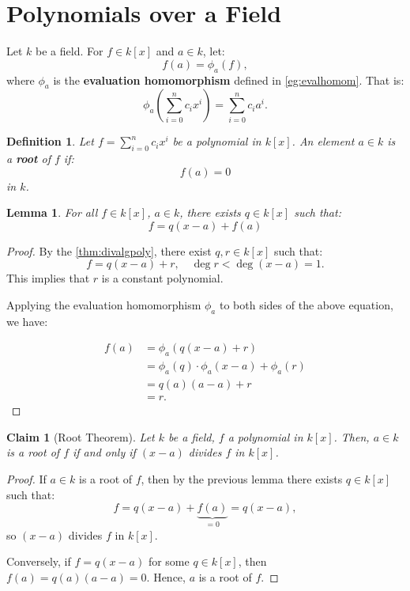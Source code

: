 \documentclass[a4paper,12pt]{report}
\newcommand{\class}[2]{#2}
\newcounter{statement}
\numberwithin{statement}{chapter}
\newtheorem{defn}[statement]{Definition}
\newtheorem{lemma}[statement]{Lemma}
\newtheorem{claim}[statement]{Claim}
\numberwithin{equation}{chapter}
\numberwithin{section}{chapter}
\numberwithin{subsection}{section}
\begin{document}
\section{Polynomials over a Field}

Let $k$ be a field.
For $f \in k[x]$ and $a \in k$, let:
\[
f(a) = \phi_a(f),
\]
where $\phi_a$ is the  {\bf evaluation homomorphism}  defined in \cref{eg:evalhomom}.
That is:
\[
\phi_a\left(\sum_{i = 0}^nc_ix^i \right) = \sum_{i = 0}^nc_ia^i .
\]



\begin{defn}
Let $f = \sum_{i = 0}^nc_ix^i$ be a polynomial in $k[x]$.
An element $a \in k$ is a  {\bf root}  of $f$ if:
\[
f(a) = 0
\]
in $k$.
\end{defn}







\begin{lemma}
For all $f \in k[x]$, $a \in k$, there exists $q \in k[x]$ such that:
\[
f = q(x - a) + f(a)
\]
\end{lemma}
\begin{proof}
By the \cref{thm:divalgpoly},
there exist $q, r \in k[x]$ such that:
\[
f = q(x - a) + r,\quad \deg r < \deg (x - a) = 1.
\]
This implies that $r$ is a constant polynomial.




Applying the evaluation homomorphism $\phi_a$ to both sides of the above equation,
we have:

\[
\begin{split}
f(a) &= \phi_a(q(x - a) + r)
\\&
\class{steps11 steps}{= \phi_a(q)\cdot\phi_a(x - a) + \phi_a(r)}
\\&
\class{steps11 steps}{ = q(a)(a - a) + r}
\\&
\class{steps11 steps}{= r.}
\end{split}
\]

\end{proof}




\begin{claim}[Root Theorem]


Let $k$ be a field, $f$ a polynomial in $k[x]$.  Then, $a \in k$
is a root of $f$ if and only if $(x - a)$ divides $f$ in $k[x]$.
\end{claim}
\begin{proof}
If $a \in k$ is a root of $f$, then by the previous lemma there exists $q \in k[x]$
such that:
\[
f = q(x - a) + \underbrace{f(a)}_{= 0} = q(x - a),
\]
so $(x - a)$ divides $f$ in $k[x]$.




Conversely, if $f = q(x - a)$ for some $q \in k[x]$, then $f(a) = q(a)(a - a) = 0$.
Hence, $a$ is a root of $f$.
\end{proof}
\end{document}
